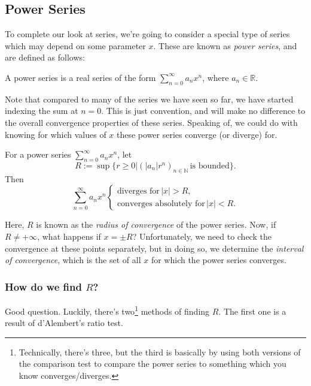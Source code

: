 \documentclass[
  17pt,
  a4paper]{extarticle}
\theoremstyle{plain}
\theoremstyle{plain}
\theoremstyle{plain}
\theoremstyle{plain}
\theoremstyle{plain}
\theoremstyle{definition}
\theoremstyle{definition}
\theoremstyle{definition}
\theoremstyle{remark}
\let\BeginKnitrBlock\begin \let\EndKnitrBlock\end
\renewcommand{\;}{\,}
\begin{document}
\hypertarget{power-series}{%
\subsection{Power Series}\label{power-series}}

To complete our look at series, we're going to consider a special type of series which may depend on some parameter \(x\). These are known as \emph{power series}, and are defined as follows:

\BeginKnitrBlock{definition}[Power Series]
{\label{def:def1} }A power series is a real series of the form \(\sum_{n = 0}^{\infty} a_n x^n\), where \(a_n \in \mathbb{R}\).
\EndKnitrBlock{definition}
Note that compared to many of the series we have seen so far, we have started indexing the sum at \(n = 0\). This is just convention, and will make no difference to the overall convergence properties of these series. Speaking of, we could do with knowing for which values of \(x\) these power series converge (or diverge) for.

\BeginKnitrBlock{proposition}
{\label{prp:prop1} }For a power series \(\sum_{n = 0}^{\infty} a_n x^n\), let \[R:= \sup\lbrace r \geq 0 \lvert \left(\lvert a_n \rvert r^n\right)_{n \in \mathbb{N}} \; \text{is bounded}\rbrace.\] Then \[\sum_{n = 0}^{\infty} a_n x^n \begin{cases}
\text{diverges for}\;\lvert x \rvert > R,\\
\text{converges absolutely for}\; \lvert x \rvert < R. 
\end{cases}\]
\EndKnitrBlock{proposition}
Here, \(R\) is known as the \emph{radius of convergence} of the power series. Now, if \(R \neq +\infty\), what happens if \(x = \pm R\)? Unfortunately, we need to check the convergence at these points separately, but in doing so, we determine the \emph{interval of convergence}, which is the set of all \(x\) for which the power series converges.

\hypertarget{how-do-we-find-r}{%
\subsubsection{\texorpdfstring{How do we find \(R\)?}{How do we find R?}}\label{how-do-we-find-r}}

Good question. Luckily, there's two\footnote{Technically, there's three, but the third is basically by using both versions of the comparison test to compare the power series to something which you know converges/diverges.} methods of finding \(R\). The first one is a result of d'Alembert's ratio test.
\end{document}
